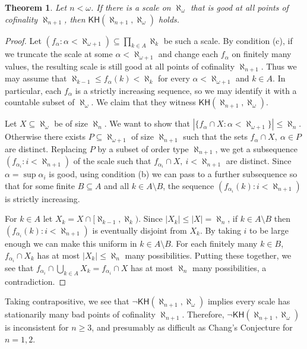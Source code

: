 \documentclass[10pt,reqno]{amsart}
\theoremstyle{plain}
\newtheorem{theorem}{Theorem}[section]
\theoremstyle{definition}
\theoremstyle{remark}
\begin{document}
\begin{theorem}
Let $n<\omega$. If there is a scale on $\aleph_\omega$ that is good at all points of cofinality $\aleph_{n+1}$, then $\mathsf{KH}(\aleph_{n+1},\aleph_\omega)$ holds.
\end{theorem}
\begin{proof}
Let $(f_\alpha:\alpha<\aleph_{\omega+1})\subseteq\prod_{k\in A}\aleph_k$ be such a scale. By condition (c), if we truncate the scale at some $\alpha<\aleph_{\omega+1}$ and change each $f_\alpha$ on finitely many values, the resulting scale is still good at all points of cofinality $\aleph_{n+1}$. Thus we may assume that $\aleph_{k-1}\leq f_\alpha(k)<\aleph_k$ for every $\alpha<\aleph_{\omega+1}$ and $k\in A$. In particular, each $f_\alpha$ is a strictly increasing sequence, so we may identify it with a countable subset of $\aleph_\omega$. We claim that they witness $\mathsf{KH}(\aleph_{n+1},\aleph_\omega)$.

Let $X\subseteq\aleph_{\omega}$ be of size $\aleph_{n}$. We want to show that $|\{f_\alpha\cap X:\alpha<\aleph_{\omega+1}\}|\leq\aleph_{n}$. Otherwise there exists $P\subseteq\aleph_{\omega+1}$ of size $\aleph_{n+1}$ such that the sets $f_\alpha\cap X,\ \alpha\in P$ are distinct. Replacing $P$ by a subset of order type $\aleph_{n+1}$, we get a subsequence $(f_{\alpha_i}:i<\aleph_{n+1})$ of the scale such that $f_{\alpha_i}\cap X,\ i<\aleph_{n+1}$ are distinct. Since $\alpha=\sup\alpha_i$ is good, using condition (b) we can pass to a further subsequence so that for some finite $B\subseteq A$ and all $k\in A\setminus B$, the sequence $(f_{\alpha_i}(k):i<\aleph_{n+1})$ is strictly increasing.

For $k\in A$ let $X_k=X\cap[\aleph_{k-1},\aleph_k)$. Since $|X_k|\leq|X|=\aleph_{n}$, if $k\in A\setminus B$ then $(f_{\alpha_i}(k):i<\aleph_{n+1})$ is eventually disjoint from $X_k$. By taking $i$ to be large enough we can make this uniform in $k\in A\setminus B$. For each finitely many $k\in B$, $f_{\alpha_i}\cap X_k$ has at most $|X_k|\leq\aleph_{n}$ many possibilities. Putting these together, we see that $f_{\alpha_i}\cap\bigcup_{k\in A}X_k=f_{\alpha_i}\cap X$ has at most $\aleph_{n}$ many possibilities, a contradiction.
\end{proof}

Taking contrapositive, we see that $\lnot\mathsf{KH}(\aleph_{n+1},\aleph_\omega)$ implies every scale has stationarily many bad points of cofinality $\aleph_{n+1}$. Therefore, $\lnot\mathsf{KH}(\aleph_{n+1},\aleph_\omega)$ is inconsistent for $n\geq 3$, and presumably as difficult as Chang's Conjecture for $n=1,2$.
\end{document}
